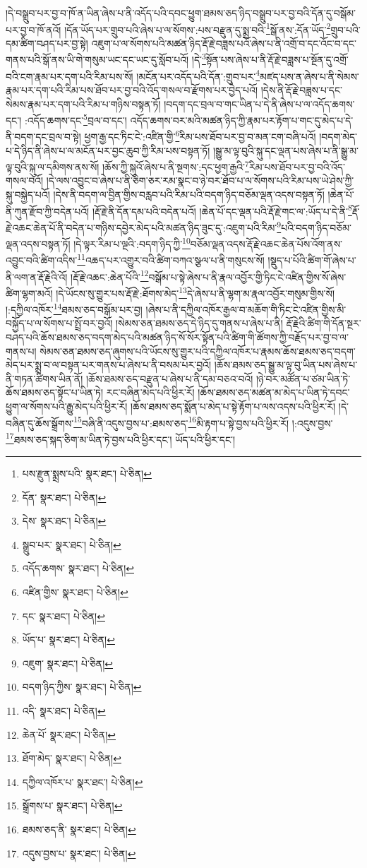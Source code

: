 །དེ་བསྒྲུབ་པར་བྱ་བ་ཁོ་ན་ཡིན་ཞེས་པ་ནི་འདོད་པའི་དབང་ཕྱུག་ཐམས་ཅད་ཉིད་བསྒྲུབ་པར་བྱ་བའི་དོན་དུ་བསྒོམ་པར་བྱ་བ་ཁོ་ནའོ། །དོན་ཡོད་པར་གྲུབ་པའི་ཞེས་པ་ལ་སོགས་:པས་བརྫུན་དུ་སྨྲ་བའི་\footnote{པས་རྫུན་སྨྲས་པའི་  སྣར་ཐང་།  པེ་ཅིན། }སྒོ་ནས་:དོན་ཡོད་\footnote{དོན་  སྣར་ཐང་།  པེ་ཅིན། }གྲུབ་པའི་དམ་ཚིག་བཤད་པར་བྱ་སྟེ། འཇུག་པ་ལ་སོགས་པའི་མཚན་ཉིད་རྡོ་རྗེ་བཟླས་པའོ་ཞེས་པ་ནི་འགྲོ་བ་དང་འོང་བ་དང་གནས་པའི་སྒོ་ནས་ཡི་གེ་གསུམ་ཡང་དང་ཡང་དུ་སློབ་པའོ། །དེ་\footnote{དེས་  སྣར་ཐང་།  པེ་ཅིན། }སྟོན་པས་ཞེས་པ་ནི་རྡོ་རྗེ་བཟླས་པ་སྔོན་དུ་འགྲོ་བའི་ངག་རྣམ་པར་དག་པའི་རིམ་པས་སོ། །མངོན་པར་འདོད་པའི་དོན་:གྲུབ་པར་\footnote{སྒྲུབ་པར་  སྣར་ཐང་།  པེ་ཅིན། }མཛད་པས་ན་ཞེས་པ་ནི་སེམས་རྣམ་པར་དག་པའི་རིམ་པས་ཐོབ་པར་བྱ་བའི་འོད་གསལ་བ་རྫོགས་པར་བྱེད་པའོ། །དེས་ནི་རྡོ་རྗེ་བཟླས་པ་དང་སེམས་རྣམ་པར་དག་པའི་རིམ་པ་གཉིས་བསྟན་ཏོ། །བདག་དང་བྲལ་བ་གང་ཡིན་པ་དེ་ནི་ཞེས་པ་ལ་འདོད་ཆགས་དང་། :འདོད་ཆགས་དང་\footnote{འདོད་ཆགས་  སྣར་ཐང་།  པེ་ཅིན། }བྲལ་བ་དང་། འདོད་ཆགས་བར་མའི་མཚན་ཉིད་ཀྱི་རྣམ་པར་རྟོག་པ་གང་དུ་མེད་པ་དེ་ནི་བདག་དང་བྲལ་བ་སྟེ། ཕྱག་རྒྱ་དང་ཏིང་ངེ་:འཛིན་གྱི་\footnote{འཛིན་གྱིས་  སྣར་ཐང་།  པེ་ཅིན། }རིམ་པས་ཐོབ་པར་བྱ་བ་མན་ངག་བཞི་པའོ། །བདག་མེད་པ་དེ་ཉིད་ནི་ཞེས་པ་ལ་མངོན་པར་བྱང་ཆུབ་ཀྱི་རིམ་པས་བསྟན་ཏོ། །སྒྱུ་མ་ལྟ་བུའི་སྐུ་དང་ལྡན་པས་ཞེས་པ་ནི་སྒྱུ་མ་ལྟ་བུའི་སྐུ་ལ་དམིགས་ནས་སོ། །ཆོས་ཀྱི་སྐུའོ་ཞེས་པ་ནི་སྔགས་:དང་ཕྱག་རྒྱའི་\footnote{དང་  སྣར་ཐང་།  པེ་ཅིན། }རིམ་པས་ཐོབ་པར་བྱ་བའི་འོད་གསལ་བའོ། །དེ་ལས་འབྱུང་བ་ཞེས་པ་ནི་ཅིག་ཅར་རམ་སྣང་བ་ཉེ་བར་ཐོབ་པ་ལ་སོགས་པའི་རིམ་པས་ཡེ་ཤེས་ཀྱི་སྐུ་བསྐྱེད་པའོ། །དེས་ནི་བདག་ལ་བྱིན་གྱིས་བརླབ་པའི་རིམ་པའི་བདག་ཉིད་བཅོམ་ལྡན་འདས་བསྟན་ཏོ། །ཆེན་པོ་ནི་ཀུན་རྫོབ་ཀྱི་བདེན་པའོ། །རྡོ་རྗེ་ནི་དོན་དམ་པའི་བདེན་པའོ། །ཆེན་པོ་དང་ལྡན་པའི་རྡོ་རྗེ་གང་ལ་:ཡོད་པ་དེ་ནི་\footnote{ཡོད་པ་  སྣར་ཐང་།  པེ་ཅིན། }རྡོ་རྗེ་འཆང་ཆེན་པོ་ནི་བདེན་པ་གཉིས་དབྱེར་མེད་པའི་མཚན་ཉིད་ཟུང་དུ་:འཇུག་པའི་རིམ་\footnote{འཇུག་  སྣར་ཐང་།  པེ་ཅིན། }པའི་བདག་ཉིད་བཅོམ་ལྡན་འདས་བསྟན་ཏོ། །དེ་ལྟར་རིམ་པ་ལྔའི་:བདག་ཉིད་ཀྱི་\footnote{བདག་ཉིད་ཀྱིས་  སྣར་ཐང་།  པེ་ཅིན། }བཅོམ་ལྡན་འདས་རྡོ་རྗེ་འཆང་ཆེན་པོས་འོག་ནས་འབྱུང་བའི་ཚིག་འདིས་\footnote{འདི་  སྣར་ཐང་།  པེ་ཅིན། }འཆད་པར་འགྱུར་བའི་ཚིག་བཀའ་སྩལ་པ་ནི་གསུངས་སོ། །སྡུད་པ་པོའི་ཚིག་གོ་ཞེས་པ་ནི་ལག་ན་རྡོ་རྗེའི་འོ། །རྡོ་རྗེ་འཆང་:ཆེན་པོའི་\footnote{ཆེན་པོ་  སྣར་ཐང་།  པེ་ཅིན། }བསྒོམ་པ་སྟེ་ཞེས་པ་ནི་རྣལ་འབྱོར་གྱི་ཏིང་ངེ་འཛིན་གྱིས་སོ་ཞེས་ཚིག་ལྷག་མའོ། །དེ་ཡོངས་སུ་གྱུར་པས་རྡོ་རྗེ་:ཐོགས་མེད་\footnote{ཐོག་མེད་  སྣར་ཐང་།  པེ་ཅིན། }དེ་ཞེས་པ་ནི་ལྷག་མ་རྣལ་འབྱོར་གསུམ་གྱིས་སོ། །:དཀྱིལ་འཁོར་\footnote{དཀྱིལ་འཁོར་པ་  སྣར་ཐང་།  པེ་ཅིན། }ཐམས་ཅད་བསྒོམ་པར་བྱ། །ཞེས་པ་ནི་དཀྱིལ་འཁོར་རྒྱལ་བ་མཆོག་གི་ཏིང་ངེ་འཛིན་གྱིས་མི་བསྐྱོད་པ་ལ་སོགས་པ་སྤྲོ་བར་བྱའོ། །སེམས་ཅན་ཐམས་ཅད་དེ་ཉིད་དུ་གནས་པ་ཞེས་པ་ནི། རྡོ་རྗེའི་ཚིག་གི་དོན་སྔར་བཤད་པའི་ཆོས་ཐམས་ཅད་བདག་མེད་པའི་མཚན་ཉིད་སོ་སོར་སྟོན་པའི་ཚིག་གི་ཚོགས་ཀྱི་བརྗོད་པར་བྱ་བ་ལ་གནས་པ། སེམས་ཅན་ཐམས་ཅད་ཞུགས་པའི་ཡོངས་སུ་གྱུར་པའི་དཀྱིལ་འཁོར་པ་རྣམས་ཆོས་ཐམས་ཅད་བདག་མེད་པར་སྨྲ་བ་ལ་བསྟན་པར་གནས་པ་ཞེས་པ་ནི་བསམ་པར་བྱའོ། །ཆོས་ཐམས་ཅད་སྒྱུ་མ་ལྟ་བུ་ཡིན་པས་ཞེས་པ་ནི་གཏན་ཚིགས་ཡིན་ནོ། །ཆོས་ཐམས་ཅད་བརྫུན་པ་ཞེས་པ་ནི་དམ་བཅའ་བའོ། །ཉེ་བར་མཚོན་པ་ཙམ་ཡིན་ཏེ་ཆོས་ཐམས་ཅད་སྟོང་པ་ཡིན་ཏེ། རང་བཞིན་མེད་པའི་ཕྱིར་རོ། །ཆོས་ཐམས་ཅད་མཚན་མ་མེད་པ་ཡིན་ཏེ་དབང་ཕྱུག་ལ་སོགས་པའི་རྒྱུ་མེད་པའི་ཕྱིར་རོ། །ཆོས་ཐམས་ཅད་སྨོན་པ་མེད་པ་སྟེ་རྟོག་པ་ལས་འདས་པའི་ཕྱིར་རོ། །དེ་བཞིན་དུ་ཆོས་སྒྲོགས་\footnote{སྒྲོགས་པ་  སྣར་ཐང་།  པེ་ཅིན། }བཞི་ནི་འདུས་བྱས་པ་:ཐམས་ཅད་\footnote{ཐམས་ཅད་ནི་  སྣར་ཐང་།  པེ་ཅིན། }མི་རྟག་པ་སྟེ་བྱས་པའི་ཕྱིར་རོ། །:འདུས་བྱས་\footnote{འདུས་བྱས་པ་  སྣར་ཐང་།  པེ་ཅིན། }ཐམས་ཅད་སྐད་ཅིག་མ་ཡིན་ཏེ་བྱས་པའི་ཕྱིར་དང་། ཡོད་པའི་ཕྱིར་དང་། 